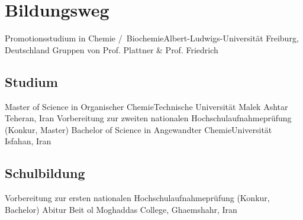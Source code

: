 

\section{Bildungsweg}

 {Promotionsstudium in Chemie \slash  ~Biochemie}{Albert-Ludwigs-Universität Freiburg, Deutschland \newline Gruppen von Prof. Plattner \& Prof. Friedrich}{}{}{}







\subsection{Studium}
 {Master of Science in Organischer Chemie}{Technische Universität Malek Ashtar Teheran, Iran}{}{}{}
 {Vorbereitung zur zweiten nationalen Hochschulaufnahmeprüfung (Konkur, Master)}{}{}{}{}
 {Bachelor of Science in Angewandter Chemie}{Universität Isfahan, Iran}{}{}{}

\subsection{Schulbildung}
 {Vorbereitung zur ersten nationalen Hochschulaufnahmeprüfung (Konkur, Bachelor)}{}{}{}{}
 {Abitur}{
}{Beit ol Moghaddas College, Ghaemshahr, Iran}{}{}{}


